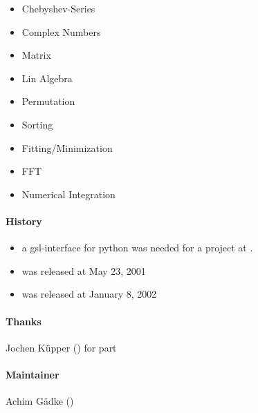 \begin{itemize}
\item Chebyshev-Series
\item Complex Numbers
\item Matrix
\item Lin Algebra
\item Permutation
\item Sorting
\item Fitting/Minimization
\item FFT
\item Numerical Integration
\end{itemize}

\paragraph*{History}
\begin{itemize}
\item a gsl-interface for python was needed for a project at
.
\item {} was released at May 23, 2001
\item {} was released at January 8, 2002
\end{itemize}

\paragraph*{Thanks}
Jochen K\"upper () for  part

\paragraph*{Maintainer}
Achim G\"adke ()
